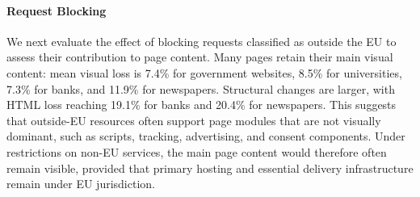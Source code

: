 \paragraph{Request Blocking}
We next evaluate the effect of blocking requests classified as outside the EU to assess their contribution to page content. Many pages retain their main visual content: mean visual loss is 7.4\% for government websites, 8.5\% for universities, 7.3\% for banks, and 11.9\% for newspapers. Structural changes are larger, with HTML loss reaching 19.1\% for banks and 20.4\% for newspapers. This suggests that outside-EU resources often support page modules that are not visually dominant, such as scripts, tracking, advertising, and consent components. Under restrictions on non-EU services, the main page content would therefore often remain visible, provided that primary hosting and essential delivery infrastructure remain under EU jurisdiction.